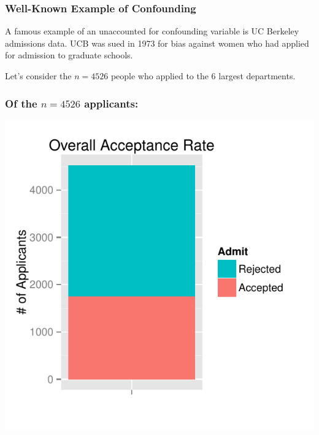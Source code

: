 \documentclass[handout]{beamer}
\begin{document}
\begin{frame}
\frametitle{Well-Known Example of Confounding}

A famous example of an unaccounted for confounding variable is UC Berkeley admissions data.  UCB was sued in 1973 for bias against women who had applied for admission to graduate schools. 

\vskip 0.5cm

\pause Let's consider the $n=4526$ people who applied to the 6 largest departments.

\end{frame}



\begin{frame}
\frametitle{Of the $n=4526$ applicants:}

\begin{center}
\includegraphics[height=\textheight]{figure/overall.pdf}
\end{center}

\end{frame}
\end{document}

